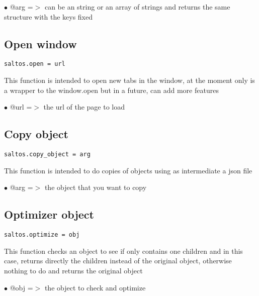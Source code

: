 \documentclass[a4paper]{book}
\begin{document}
\begin{compactitem}
\item[\color{myblue}$\bullet$] @arg =$>$ can be an string or an array of strings and returns the same structure with the keys fixed
\end{compactitem}

\hypertarget{toc428}{}
\subsection{Open window}

\begin{lstlisting}
saltos.open = url
\end{lstlisting}

This function is intended to open new tabs in the window, at the moment only is a wrapper to
the window.open but in a future, can add more features

\begin{compactitem}
\item[\color{myblue}$\bullet$] @url =$>$ the url of the page to load
\end{compactitem}

\hypertarget{toc429}{}
\subsection{Copy object}

\begin{lstlisting}
saltos.copy_object = arg
\end{lstlisting}

This function is intended to do copies of objects using as intermediate a json file

\begin{compactitem}
\item[\color{myblue}$\bullet$] @arg =$>$ the object that you want to copy
\end{compactitem}

\hypertarget{toc430}{}
\subsection{Optimizer object}

\begin{lstlisting}
saltos.optimize = obj
\end{lstlisting}

This function checks an object to see if only contains one children and
in this case, returns directly the children instead of the original object,
otherwise nothing to do and returns the original object

\begin{compactitem}
\item[\color{myblue}$\bullet$] @obj =$>$ the object to check and optimize
\end{compactitem}

\end{document}

